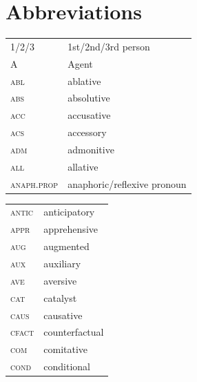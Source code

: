 \documentclass[output=paper,colorlinks,citecolor=brown]{langscibook}
\begin{document}
\section*{Abbreviations}
\begin{tabularx}{.5\textwidth}{@{}lQ@{}}
\textsc{1/2/3} & 1st/2nd/3rd person \\
\textsc{A} & Agent\\
\textsc{abl} & ablative \\
\textsc{abs} & absolutive \\
\textsc{acc} & accusative \\
\textsc{acs} & accessory \\
\textsc{adm} & admonitive\\
\textsc{all} & allative\\
\textsc{anaph.prop} & anaphoric/reflexive pronoun \end{tabularx}
\begin{tabularx}{.5\textwidth}{@{}lQ@{}}
\textsc{antic} & anticipatory \\
\textsc{appr} & apprehensive \\
\textsc{aug} & augmented \\
\textsc{aux} & auxiliary\\
\textsc{ave} & aversive \\
\textsc{cat} & catalyst \\
\textsc{caus} & causative \\
\textsc{cfact} & counterfactual \\
\textsc{com} & comitative\\
\textsc{cond} & conditional \end{tabularx}
\end{document}
